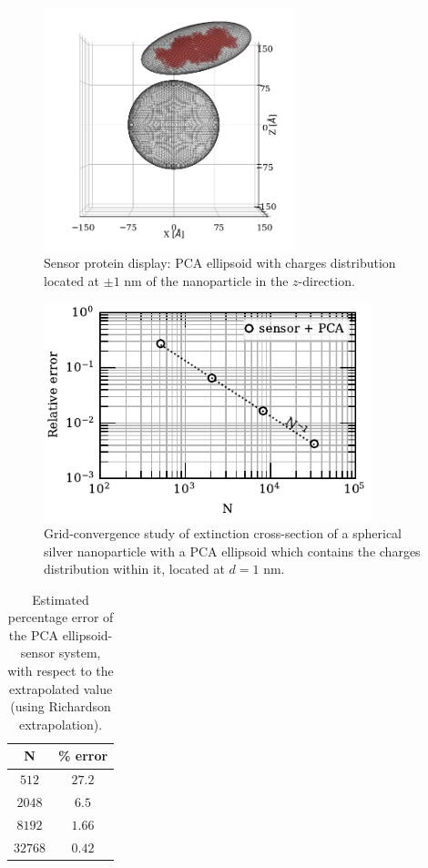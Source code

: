 \begin{figure}%
    \centering
    \includegraphics[width=0.65\textwidth]{viz/one_pca_full_display.png} 
    \caption{Sensor protein display: PCA ellipsoid with charges distribution located at $\pm 1$ nm of the 
    nanoparticle in the $z$-direction.}
    \label{fig:one_pca_sketch}
 \end{figure}


\begin{figure}%
    \centering
    \includegraphics[width=0.85\textwidth]{convergence_sensor_pca_w380.pdf} 
    \caption{Grid-convergence study of extinction cross-section of a spherical silver
             nanoparticle with a PCA ellipsoid which contains 
             the charges distribution within it, located at $d=1$ nm.}
    \label{fig:err_sph-pca}
 \end{figure}

 \begin{table}%
    \centering
    \caption{\label{table:err_sph-pca} Estimated percentage error of the PCA ellipsoid-sensor 
    system, with respect to the extrapolated value (using Richardson extrapolation).} 
    \begin{tabular}{c c}
    \hline%
    N & \% error \\
    \hline%
     $512$ & $27.2$ \\
     $2048$ & $6.5$ \\
     $8192$ & $1.66$ \\
     $32768$ & $0.42$ \\
    \hline%
    \end{tabular}
\end{table}

